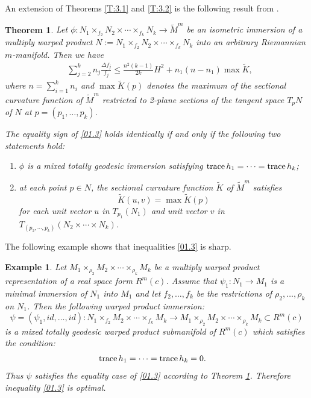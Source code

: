 \documentclass{amsart}
\theoremstyle{plain}
\newtheorem{theorem}{Theorem}[section]
\newtheorem{example}{Example}[section]
\numberwithin{equation}{section}
\theoremstyle{remark}
\numberwithin{equation}{section}
\begin{document}
An extension of Theorems \ref{T:3.1} and \ref{T:3.2} is the following result from \cite{CD08-2}.

\begin{theorem}\label{T:CD} Let $\phi:N_1 \times_{f_2} N_2 \times \cdots \times_{f_k} N_k\to \tilde M^m$ be an isometric immersion of a multiply warped product
$N:=N_1 \times_{f_2} N_2 \times \cdots \times_{f_k} N_k$ into an arbitrary Riemannian $m$-manifold. Then we have
\begin{align} \label{01.3} & \sum_{j=2}^k n_j\frac{\Delta f_j}{f_j} \leq \frac{n^2(k-1)}{2k} H^2
 + n_1(n-n_1) \max\tilde K, \end{align}
where $n=\sum_{i=1}^{k}n_{i}$ and $\max\tilde K(p)$ denotes the maximum of the sectional curvature function of $\tilde M^m$ restricted to 2-plane sections of the tangent space $T_pN$ of $N$ at $p=(p_1,\ldots,p_k)$.

The equality sign of \eqref{01.3} holds identically if and only if the following two statements hold:
\begin{enumerate}
 \item $\phi$ is a mixed totally geodesic immersion satisfying ${\rm trace}\, h_1=\cdots={\rm trace }\,h_k$;

\item at each point $p\in N$,  the sectional curvature function $\tilde K$ of $\tilde M^m$ satisfies $$\tilde K(u,v)=\max \tilde K(p)$$ for each unit vector $u$ in $T_{p_1}(N_1)$ and unit vector $v$ in $T_{(p_2,\cdots,p_k)}(N_2\times \cdots\times N_k)$. \end{enumerate} \end{theorem}

The following example shows that inequalities \eqref{01.3} is sharp.

\begin{example}\label{E:4.1} {\rm
Let $M_1\times_{\rho_2} M_2\times \cdots\times_{\rho_k} M_k$ be a {\it multiply warped product representation\/} of a real space form $R^m(c)$. Assume that $\psi_1:N_1\to M_1$ is a minimal immersion of $N_1$ into $M_1$ and let $f_2,\ldots,f_k$ be the restrictions of $\rho_2,\ldots,\rho_k$ on $N_1$. Then the following warped product
immersion:
$$\psi=(\psi_1,id,\ldots,id):N_1\times_{f_2} M_2\times \cdots\times_{f_k} M_k\to
M_1\times_{\rho_2} M_2\times \cdots\times_{\rho_k} M_k\subset R^m(c)$$
is a mixed totally geodesic warped product submanifold of $R^m(c)$ which satisfies the condition:
\begin{align*}&{\rm trace}\, h_1=\cdots={\rm trace }\,h_k =0. \end{align*}
Thus $\psi$ satisfies the equality case of \eqref{01.3} according to Theorem \ref{T:CD}. Therefore inequality \eqref{01.3} is optimal.}
\end{example}
\end{document}
